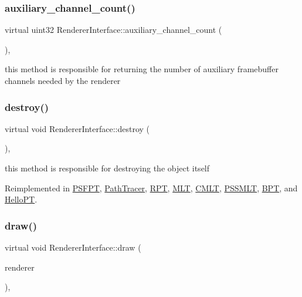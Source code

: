 \subsubsection{\texorpdfstring{auxiliary\+\_\+channel\+\_\+count()}{auxiliary\_channel\_count()}}
{\footnotesize\ttfamily virtual uint32 Renderer\+Interface\+::auxiliary\+\_\+channel\+\_\+count (\begin{DoxyParamCaption}{ }\end{DoxyParamCaption})\hspace{0.3cm}{\ttfamily [inline]}, {\ttfamily [virtual]}}

this method is responsible for returning the number of auxiliary framebuffer channels needed by the renderer \mbox{\label{struct_renderer_interface_a7469218aafa029a3e22bac2c00dca9f5}} 
\subsubsection{\texorpdfstring{destroy()}{destroy()}}
{\footnotesize\ttfamily virtual void Renderer\+Interface\+::destroy (\begin{DoxyParamCaption}{ }\end{DoxyParamCaption})\hspace{0.3cm}{\ttfamily [inline]}, {\ttfamily [virtual]}}

this method is responsible for destroying the object itself 

Reimplemented in \hyperlink{struct_p_s_f_p_t_ad22588eeea40701d2af23513262a08bd}{P\+S\+F\+PT}, \hyperlink{struct_path_tracer_a3c4e7e9eb10e92c6a6d5cc94bbf93ee7}{Path\+Tracer}, \hyperlink{struct_r_p_t_a201a475612d2fa357ff9fa6d75ad5dfe}{R\+PT}, \hyperlink{struct_m_l_t_adb75fd53b62131575a9f739953eeac67}{M\+LT}, \hyperlink{struct_c_m_l_t_aa8558dad2db5508be7aa028f69af7308}{C\+M\+LT}, \hyperlink{struct_p_s_s_m_l_t_a3dea533efa6d4ffd79e336131e83ba34}{P\+S\+S\+M\+LT}, \hyperlink{struct_b_p_t_aef80ec5312cbbf38e5dc9e6c37058825}{B\+PT}, and \hyperlink{struct_hello_p_t_ac81e09dcfb28dffc85aa6c4df06a4426}{Hello\+PT}.

\mbox{\label{struct_renderer_interface_a44e91217896e95a3fd46b26eef51a6da}} 
\subsubsection{\texorpdfstring{draw()}{draw()}}
{\footnotesize\ttfamily virtual void Renderer\+Interface\+::draw (\begin{DoxyParamCaption}\item[{\hyperlink{struct_rendering_context}{Rendering\+Context} \&}]{renderer }\end{DoxyParamCaption})\hspace{0.3cm}{\ttfamily [inline]}, {\ttfamily [virtual]}}


